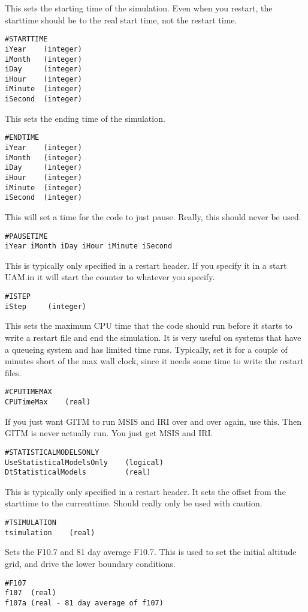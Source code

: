 This sets the starting time of the simulation.
Even when you restart, the starttime should be
to the real start time, not the restart time.
\begin{verbatim}
#STARTTIME
iYear    (integer)
iMonth   (integer)
iDay     (integer)
iHour    (integer)
iMinute  (integer)
iSecond  (integer)
\end{verbatim}

This sets the ending time of the simulation.
\begin{verbatim}
#ENDTIME
iYear    (integer)
iMonth   (integer)
iDay     (integer)
iHour    (integer)
iMinute  (integer)
iSecond  (integer)
\end{verbatim}

This will set a time for the code to just pause.
Really, this should never be used.
\begin{verbatim}
#PAUSETIME
iYear iMonth iDay iHour iMinute iSecond
\end{verbatim}

This is typically only specified in a
restart header.  If you specify it in a start UAM.in
it will start the counter to whatever you specify.
\begin{verbatim}
#ISTEP
iStep     (integer)
\end{verbatim}

This sets the maximum CPU time that the code should
run before it starts to write a restart file and end
the simulation.  It is very useful on systems that
have a queueing system and has limited time runs.
Typically, set it for a couple of minutes short of
the max wall clock, since it needs some time to write
the restart files.
\begin{verbatim}
#CPUTIMEMAX
CPUTimeMax    (real)
\end{verbatim}

If you just want GITM to run MSIS and IRI over and
over again, use this.  Then GITM is never actually
run.  You just get MSIS and IRI.
\begin{verbatim}
#STATISTICALMODELSONLY
UseStatisticalModelsOnly    (logical)
DtStatisticalModels         (real)
\end{verbatim}

This is typically only specified in a
restart header.
It sets the offset from the starttime to the
currenttime. Should really only be used with caution.
\begin{verbatim}
#TSIMULATION
tsimulation    (real)
\end{verbatim}

Sets the F10.7 and 81 day average F10.7.  This is
used to set the initial altitude grid, and drive the
lower boundary conditions.
\begin{verbatim}
#F107
f107  (real)
f107a (real - 81 day average of f107)
\end{verbatim}

